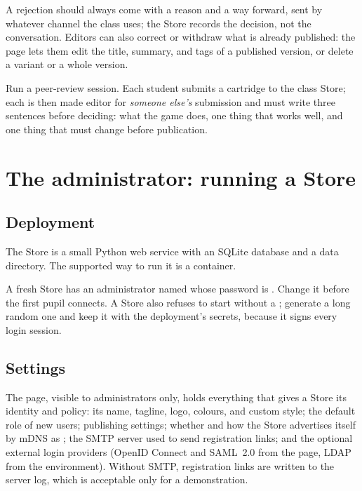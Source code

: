 A rejection should always come with a reason and a way forward, sent by
whatever channel the class uses; the Store records the decision, not the
conversation. Editors can also correct or withdraw what is already published:
the  page lets them edit the title, summary, and tags of a
published version, or delete a variant or a whole version.

\begin{prgtry}
Run a peer-review session. Each student submits a cartridge to the class Store;
each is then made editor for \emph{someone else's} submission and must write
three sentences before deciding: what the game does, one thing that works well,
and one thing that must change before publication.
\end{prgtry}

\section{The administrator: running a Store}

\subsection{Deployment}

The Store is a small Python web service with an SQLite database and a data
directory. The supported way to run it is a container.



\begin{prgwarn}
A fresh Store has an administrator named  whose password is
. Change it before the first pupil connects. A Store also
refuses to start without a ; generate a long random one and
keep it with the deployment's secrets, because it signs every login session.
\end{prgwarn}

\subsection{Settings}

The  page, visible to administrators only, holds everything that
gives a Store its identity and policy: its name, tagline, logo, colours, and
custom style; the default role of new users; publishing settings; whether and
how the Store advertises itself by mDNS as ;
the SMTP server used to send registration links; and the optional external
login providers (OpenID Connect and SAML~2.0 from the page, LDAP from the
environment). Without SMTP, registration links are written to the server log,
which is acceptable only for a demonstration.


